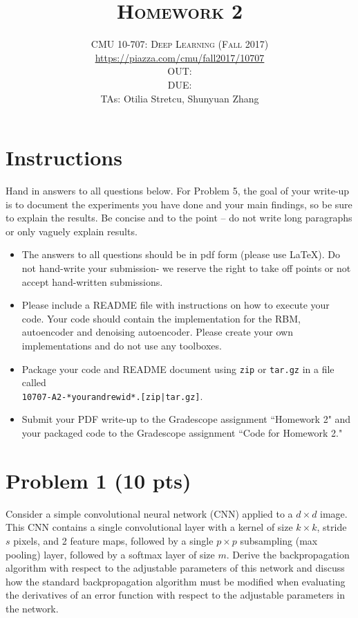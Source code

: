 \documentclass[10pt]{article}
\title{\textsc{Homework 2}} %
\author{CMU 10-707: \textsc{Deep Learning (Fall 2017)} \\
\url{https://piazza.com/cmu/fall2017/10707} \\
OUT: \outDate{} \\
DUE: \dueDate{} \\
TAs: Otilia Stretcu, Shunyuan Zhang}
\date{}
\begin{document}
\maketitle
\setcounter{page}{1}





\section*{Instructions}
Hand in answers to all questions below. For Problem 5,
the goal of your write-up is to document the experiments you have done and your main findings, so be sure to explain the results. Be concise and to the point -- do not write long paragraphs or only vaguely explain results.

\begin{itemize}
\item
The answers to all questions
should be in pdf form (please use \LaTeX). Do not hand-write your submission- we reserve the right to take off points or not accept hand-written submissions.
\item Please include a README file with instructions on how to execute your code.
Your code should contain the implementation for the RBM, autoencoder and denoising autoencoder. Please create your own implementations and do not use any toolboxes.

\item Package your code and README document using
\texttt{zip} or \texttt{tar.gz} in a file called \\
\texttt{10707-A2-*yourandrewid*.[zip|tar.gz]}.

\item Submit your PDF write-up to the Gradescope assignment ``Homework 2" and your packaged code to the Gradescope assignment ``Code for Homework 2."

\end{itemize}
\section*{Problem 1 (10 pts)}

Consider a simple convolutional neural network (CNN) 
applied to a $d \times d$ image.
This CNN contains a single convolutional layer with a kernel of size 
$k \times k$, stride $s$ pixels, and 2 feature maps, followed by a single 
$p \times p$ subsampling (max pooling) layer, followed by 
a softmax layer of size $m$.   
Derive the backpropagation algorithm with respect to the adjustable parameters of 
this network and discuss 
how the standard backpropagation algorithm must be modified 
when evaluating the derivatives of an error function with respect to the adjustable parameters in the network.
\end{document}
